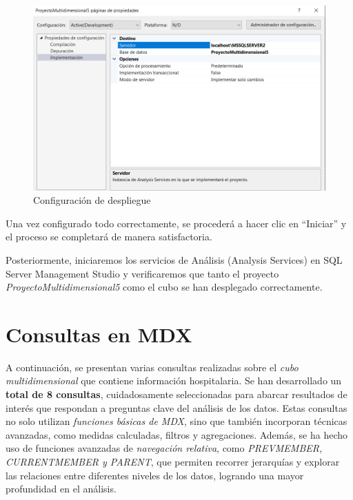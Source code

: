\documentclass[12pt, a4paper, twoside]{article}
\begin{document}
	 \begin{figure}[H]
	 	\centering
	 	\includegraphics[width=1\textwidth]{image/despliegue}
	 	\caption{Configuración de despliegue}
	 	\label{fig:3}
	 \end{figure}
	 
	 Una vez configurado todo correctamente, se procederá a hacer clic en ``Iniciar'' y el proceso se completará de manera satisfactoria. 
	 
	Posteriormente, iniciaremos los servicios de Análisis (Analysis Services) en SQL Server Management Studio y verificaremos que tanto el proyecto \textit{ProyectoMultidimensional5} como el cubo se han desplegado correctamente.
	
	 
	
	\section{Consultas en MDX}
	
	A continuación, se presentan varias consultas realizadas sobre el \textit{cubo multidimensional} que contiene información hospitalaria. Se han desarrollado un \textbf{total de 8 consultas}, cuidadosamente seleccionadas para abarcar resultados de interés que respondan a preguntas clave del análisis de los datos. Estas consultas no solo utilizan \textit{funciones básicas de  MDX}, sino que también incorporan técnicas avanzadas, como medidas calculadas, filtros y agregaciones. Además, se ha hecho uso de funciones avanzadas de \textit{navegación relativa}, como \textit{PREVMEMBER, CURRENTMEMBER y PARENT}, que permiten recorrer jerarquías y explorar las relaciones entre diferentes niveles de los datos, logrando una mayor profundidad en el análisis.
	
\end{document}
